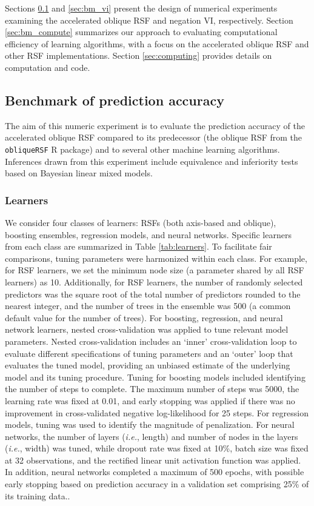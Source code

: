 \documentclass[12pt]{article}\usepackage[]{graphicx}\usepackage[]{xcolor}
\newcommand{\ie}{\textit{i.e.}}
\newcommand{\secref}[1]{Section \ref{#1}}
\newcommand{\tabref}[1]{Table \ref{#1}}
\begin{document}
Sections \ref{sec:bm_pred} and \ref{sec:bm_vi} present the design of numerical experiments examining the accelerated oblique RSF and negation VI, respectively. \secref{sec:bm_compute} summarizes our approach to evaluating computational efficiency of learning algorithms, with a focus on the accelerated oblique RSF and other RSF implementations. \secref{sec:computing} provides details on computation and code.

\subsection{Benchmark of prediction accuracy} \label{sec:bm_pred}

The aim of this numeric experiment is to evaluate the prediction accuracy of the accelerated oblique RSF compared to its predecessor (the oblique RSF from the \texttt{obliqueRSF} R package) and to several other machine learning algorithms. Inferences drawn from this experiment include equivalence and inferiority tests based on Bayesian linear mixed models.

\subsubsection{Learners} \label{sec:learners}

We consider four classes of learners: RSFs (both axis-based and oblique), boosting ensembles, regression models, and neural networks. Specific learners from each class are summarized in \tabref{tab:learners}. To facilitate fair comparisons, tuning parameters were harmonized within each class. For example, for RSF learners, we set the minimum node size (a parameter shared by all RSF learners) as 10. Additionally, for RSF learners, the number of randomly selected predictors was the square root of the total number of predictors rounded to the nearest integer, and the number of trees in the ensemble was 500 (a common default value for the number of trees). For boosting, regression, and neural network learners, nested cross-validation was applied to tune relevant model parameters. Nested cross-validation includes an `inner' cross-validation loop to evaluate different specifications of tuning parameters and an `outer' loop that evaluates the tuned model, providing an unbiased estimate of the underlying model and its tuning procedure. Tuning for boosting models included identifying the number of steps to complete. The maximum number of steps was 5000, the learning rate was fixed at 0.01, and early stopping was applied if there was no improvement in cross-validated negative log-likelihood for 25 steps. For regression models, tuning was used to identify the magnitude of penalization. For neural networks, the number of layers (\ie, length) and number of nodes in the layers (\ie, width) was tuned, while dropout rate was fixed at 10\%, batch size was fixed at 32 observations, and the rectified linear unit activation function was applied. In addition, neural networks completed a maximum of 500 epochs, with possible early stopping based on prediction accuracy in a validation set comprising 25\% of its training data..
\end{document}
